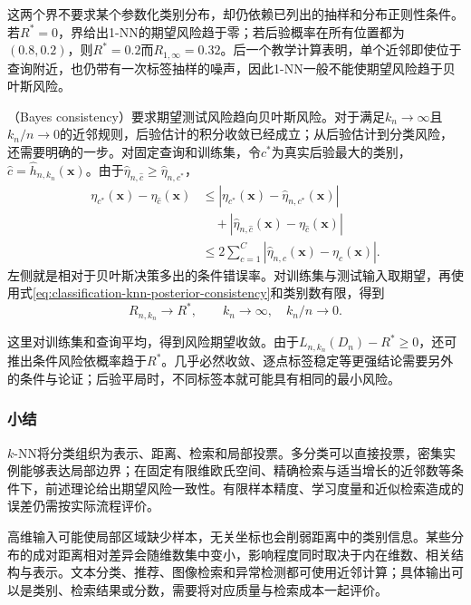 这两个界不要求某个参数化类别分布，却仍依赖已列出的抽样和分布正则性条件。若$R^\ast=0$，界给出1-NN的期望风险趋于零；若后验概率在所有位置都为$(0.8,0.2)$，则$R^\ast=0.2$而$R_{1,\infty}=0.32$。后一个教学计算表明，单个近邻即使位于查询附近，也仍带有一次标签抽样的噪声，因此1-NN一般不能使期望风险趋于贝叶斯风险。

（Bayes consistency）要求期望测试风险趋向贝叶斯风险。对于满足$k_n\to\infty$且$k_n/n\to0$的近邻规则，后验估计的积分收敛已经成立；从后验估计到分类风险，还需要明确的一步。对固定查询和训练集，令$c^\ast$为真实后验最大的类别，$\hat c=\hat h_{n,k_n}(\bm{x})$。由于$\hat\eta_{n,\hat c}\geq\hat\eta_{n,c^\ast}$，
\begin{align*}
  \eta_{c^\ast}(\bm{x})-\eta_{\hat c}(\bm{x})
  &\leq|\eta_{c^\ast}(\bm{x})-\hat\eta_{n,c^\ast}(\bm{x})|\\
  &\quad+|\hat\eta_{n,\hat c}(\bm{x})-\eta_{\hat c}(\bm{x})|\\
  &\leq2\sum_{c=1}^{C}
    |\hat\eta_{n,c}(\bm{x})-\eta_c(\bm{x})|.
\end{align*}
左侧就是相对于贝叶斯决策多出的条件错误率。对训练集与测试输入取期望，再使用式\eqref{eq:classification-knn-posterior-consistency}和类别数有限，得到
\begin{equation}
  R_{n,k_n}\longrightarrow R^\ast,
  \qquad k_n\to\infty,\quad k_n/n\to0.
  \label{eq:classification-knn-bayes-consistency}
\end{equation}

这里对训练集和查询平均，得到风险期望收敛。由于$L_{n,k_n}(D_n)-R^\ast\geq0$，还可推出条件风险依概率趋于$R^\ast$。几乎必然收敛、逐点标签稳定等更强结论需要另外的条件与论证；后验平局时，不同标签本就可能具有相同的最小风险。

\subsubsection{小结}
\label{sec:classification-knn-summary}

$k$-NN将分类组织为表示、距离、检索和局部投票。多分类可以直接投票，密集实例能够表达局部边界；在固定有限维欧氏空间、精确检索与适当增长的近邻数等条件下，前述理论给出期望风险一致性。有限样本精度、学习度量和近似检索造成的误差仍需按实际流程评价。

高维输入可能使局部区域缺少样本，无关坐标也会削弱距离中的类别信息。某些分布的成对距离相对差异会随维数集中变小，影响程度同时取决于内在维数、相关结构与表示。文本分类、推荐、图像检索和异常检测都可使用近邻计算；具体输出可以是类别、检索结果或分数，需要将对应质量与检索成本一起评价。


